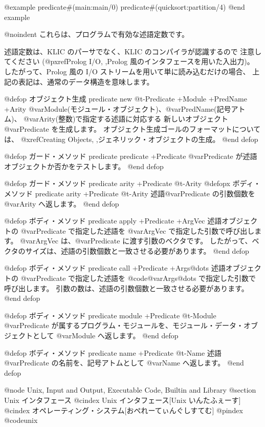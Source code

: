 {{{{@example
predicate#(main:main/0)  predicate#(quicksort:partition/4)
@end example

@noindent
これらは、プログラムで有効な述語定数です。

述語定数は、KLIC のパーサでなく、KLIC のコンパイラが認識するので
注意してください
(@pxref{Prolog I/O, ,Prolog 風のインタフェースを用いた入出力})。
したがって、Prolog 風の I/O ストリームを用いて単に読み込むだけの場合、
上記の表記は、通常のデータ構造を意味します。

@defop {オブジェクト生成} {predicate} new @t{-}Predicate +Module +PredName +Arity
@var{Module}(モジュール・オブジェクト)、@var{PredName}(記号アトム)、
@var{Arity}(整数)で指定する述語に対応する
新しいオブジェクト @var{Predicate} を生成します。
オブジェクト生成ゴールのフォーマットについては、
@xref{Creating Objects, ,ジェネリック・オブジェクトの生成}。
@end defop

@defop {ガード・メソッド} {predicate} predicate +Predicate
@var{Predicate} が述語オブジェクトか否かをテストします。
@end defop

@defop {ガード・メソッド} {predicate} arity +Predicate @t{-}Arity
@defopx {ボディ・メソッド} {predicate} arity +Predicate @t{-}Arity
述語@var{Predicate} の引数個数を @var{Arity} へ返します。
@end defop

@defop {ボディ・メソッド} {predicate} apply +Predicate +ArgVec
述語オブジェクトの @var{Predicate} で指定した述語を @var{ArgVec} で指定した引数で呼び出します。
@var{ArgVec} は、@var{Predicate} に渡す引数のベクタです。
したがって、ベクタのサイズは、述語の引数個数と一致させる必要があります。
@end defop

@defop {ボディ・メソッド} {predicate} call +Predicate +Args@dots{}
述語オブジェクトの @var{Predicate} で指定した述語を @code{@var{Args}@dots{}} で指定した引数で呼び出します。
引数の数は、述語の引数個数と一致させる必要があります。
@end defop

@defop {ボディ・メソッド} {predicate} module +Predicate @t{-}Module
@var{Predicate} が属するプログラム・モジュールを、モジュール・データ・オブジェクトとして @var{Module} へ返します。
@end defop

@defop {ボディ・メソッド} {predicate} name +Predicate @t{-}Name
述語 @var{Predicate} の名前を、記号アトムとして @var{Name} へ返します。
@end defop

@node Unix, Input and Output, Executable Code, Builtin and Library
@section Unix インタフェース
@cindex Unix インタフェース[Unix いんたふぇーす]
@cindex オペレーティング・システム[おぺれーてぃんぐしすてむ]
@pindex @code{unix}

}}}}
